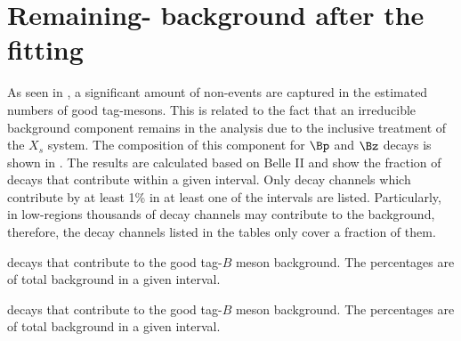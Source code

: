 \chapter{Remaining-\texorpdfstring{\BB}{BB} background after the \texorpdfstring{\Mbc}{Mbc} fitting}\label{sec:appendix_remaining_bb}

As seen in ,
a significant amount of non-\BtoXsgamma events are captured in the estimated numbers of good tag-\B mesons.
This is related to the fact that an irreducible background component remains in the analysis due to the inclusive treatment of the $X_s$ system.
The composition of this component for $\Bp$ and $\Bz$ decays is shown in .
The results are calculated based on Belle II \MC and show the fraction of \B decays that contribute within a given \EB interval.
Only decay channels which contribute by at least 1\% in at least one of the \EB intervals are listed.
Particularly, in low-\EB regions thousands of decay channels may contribute to the background, therefore, the decay channels listed in the tables only cover a fraction of them.
\begin{table}[htbp!]
    \caption{\label{tab:leftover_bz}
    \Bz decays that contribute to the good tag-$B$ meson background. 
    The percentages are of total \Bz background in a given interval.}
    
\end{table}
\begin{table}[htbp!]
    \caption{\label{tab:leftover_bp}
    \Bp decays that contribute to the good tag-$B$ meson background. 
    The percentages are of total \Bp background in a given interval.}
    
\end{table}

